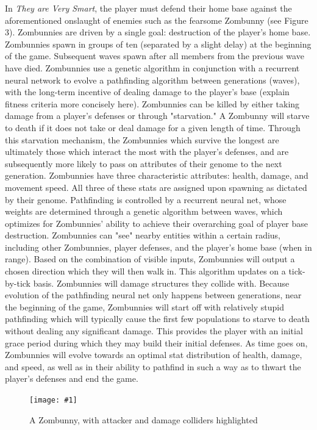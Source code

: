 \documentclass[letterpaper]{article}
\def\imfig#1#2{\begin{figure}[h] \centering \texttt{[image: \#1]} \caption{#2} \end{figure}}
\def\tavs{\textit{They are Very Smart}}
\begin{document}
\pagebreak
In \tavs, the player must defend their home base against the aforementioned onslaught of enemies such as the fearsome Zombunny (see Figure 3). Zombunnies are driven by a single goal: destruction of the player's home base. Zombunnies spawn in groups of ten (separated by a slight delay) at the beginning of the game. Subsequent waves spawn after all members from the previous wave have died. Zombunnies use a genetic algorithm in conjunction with a recurrent neural network to evolve a pathfinding algorithm between generations (waves), with the long-term incentive of dealing damage to the player's base (explain fitness criteria more concisely here). Zombunnies can be killed by either taking damage from a player's defenses or through "starvation." A Zombunny will starve to death if it does not take or deal damage for a given length of time. Through this starvation mechanism, the Zombunnies which survive the longest are ultimately those which interact the most with the player's defenses, and are subsequently more likely to pass on attributes of their genome to the next generation. Zombunnies have three characteristic attributes: health, damage, and movement speed. All three of these stats are assigned upon spawning as dictated by their genome. Pathfinding is controlled by a recurrent neural net, whose weights are determined through a genetic algorithm between waves, which optimizes for Zombunnies' ability to achieve their overarching goal of player base destruction. Zombunnies can "see" nearby entities within a certain radius, including other Zombunnies, player defenses, and the player's home base (when in range). Based on the combination of visible inputs, Zombunnies will output a chosen direction which they will then walk in. This algorithm updates on a tick-by-tick basis. Zombunnies will damage structures they collide with. Because evolution of the pathfinding neural net only happens between generations, near the beginning of the game, Zombunnies will start off with relatively stupid pathfinding which will typically cause the first few populations to starve to death without dealing any significant damage. This provides the player with an initial grace period during which they may build their initial defenses. As time goes on, Zombunnies will evolve towards an optimal stat distribution of health, damage, and speed, as well as in their ability to pathfind in such a way as to thwart the player's defenses and end the game.

\imfig{ZombunnyColliders}{A Zombunny, with attacker and damage colliders highlighted}
\end{document}
